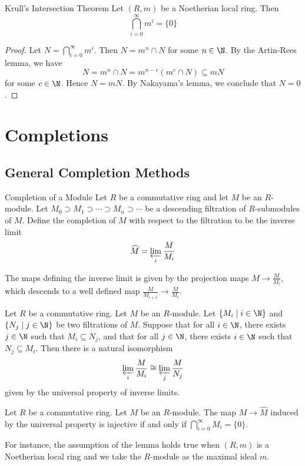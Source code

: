 \documentclass[a4paper]{article}
\begin{document}
\begin{thm}{Krull's Intersection Theorem}{} Let $(R,m)$ be a Noetherian local ring. Then $$\bigcap_{i=0}^\infty m^i=\{0\}$$ 
\begin{proof}
Let $N=\bigcap_{i=0}^\infty m^i$. Then $N=m^n\cap N$ for some $n\in\N$. By the Artin-Rees lemma, we have $$N=m^n\cap N=m^{n-c}(m^c\cap N)\subseteq mN$$ for some $c\in\N$. Hence $N=mN$. By Nakayama's lemma, we conclude that $N=0$. 
\end{proof}
\end{thm}

\pagebreak
\section{Completions}
\subsection{General Completion Methods}
\begin{defn}{Completion of a Module}{} Let $R$ be a commutative ring and let $M$ be an $R$-module. Let $M_0\supset M_1\supset\cdots\supset M_n\supset\cdots$ be a descending filtration of $R$-submodules of $M$. Define the completion of $M$ with respect to the filtration to be the inverse limit $$\widehat{M}=\varprojlim_i\frac{M}{M_i}$$
\end{defn}

The maps defining the inverse limit is given by the projection maps $M\to\frac{M}{M_i}$, which descends to a well defined map $\frac{M}{M_{i+1}}\to\frac{M}{M_i}$. 

\begin{lmm}{}{} Let $R$ be a commutative ring. Let $M$ be an $R$-module. Let $\{M_i\;|\;i\in\N\}$ and $\{N_j\;|\;j\in\N\}$ be two filtrations of $M$. Suppose that for all $i\in\N$, there exists $j\in\N$ such that $M_i\subseteq N_j$, and that for all $j\in\N$, there exists $i\in\N$ such that $N_j\subseteq M_i$. Then there is a natural isomorphism $$\varprojlim_i\frac{M}{M_i}\cong\varprojlim_j\frac{M}{N_j}$$ given by the universal property of inverse limits. 
\end{lmm}

\begin{lmm}{}{} Let $R$ be a commutative ring. Let $M$ be an $R$-module. The map $M\to\widehat{M}$ induced by the universal property is injective if and only if $\bigcap_{i=0}^\infty M_i=\{0\}$. 
\end{lmm}

For instance, the assumption of the lemma holds true when $(R,m)$ is a Noetherian local ring and we take the $R$-module as the maximal ideal $m$. 
\end{document}
